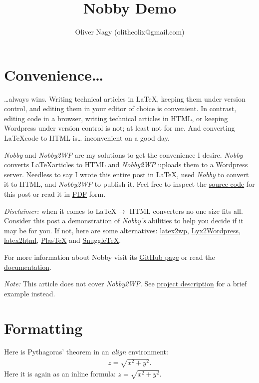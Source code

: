 \documentclass[10pt]{article}
\title{Nobby Demo}
\author{Oliver Nagy (olitheolix@gmail.com)}
\begin{document}
\maketitle

\section*{Convenience\ldots}
\ldots always wins. Writing technical articles in \LaTeX, keeping them
under version control, and editing them in your editor of choice is
convenient. In contrast, editing code in a browser, writing technical
articles in HTML, or keeping Wordpress under version control is not;
at least not for me. And converting \LaTeX  code to HTML is\ldots
inconvenient on a good day.

\emph{Nobby} and \emph{Nobby2WP} are my solutions to get the convenience I
desire. \emph{Nobby} converts \LaTeX articles to HTML
and \emph{Nobby2WP} uploads them to a Wordpress server. Needless to
say I wrote this entire post in \LaTeX, used \emph{Nobby} to convert
it to HTML, and \emph{Nobby2WP} to publish it. Feel free to inspect the
\href{https://github.com/olitheolix/nobby/blob/master/demo/demo.tex}{source
code} for this post or read it in \href{./demo.pdf}{PDF} form.

\emph{Disclaimer:} when it comes to \LaTeX $\to $ HTML converters no
one size fits all. Consider this post a demonstration of
\emph{Nobby's} abilities to help you decide if it may be for you. If not,
here are some alternatives:
\href{http://lucatrevisan.wordpress.com/latex-to-wordpress/}{latex2wp},
\href{http://physicspages.com/tag/latex2wp/}{Lyx2Wordpress},
\href{http://www.latex2html.org/}{latex2html},
\href{http://plastex.sourceforge.net/}{PlasTeX} and
\href{http://www2.ph.ed.ac.uk/snuggletex/documentation/overview-and-features.html}{SnuggleTeX}.

For more information about Nobby visit its
\href{https://github.com/olitheolix/nobby}{GitHub page} or read the
\href{https://olitheolix.com/doc/nobby}{documentation}.

\emph{Note:} This article does not cover \emph{Nobby2WP}. See 
\href{https://github.com/olitheolix/nobby}{project description}
for a brief example instead.

\section{Formatting}
\label{sec:one}
Here is Pythagoras' theorem in an \emph{align} environment:
\begin{align}
  \label{eq:pyth}
  z = \sqrt{x^2 + y^2}.
\end{align}
Here it is again as an inline formula: $z = \sqrt{x^2 + y^2}$.
\end{document}

